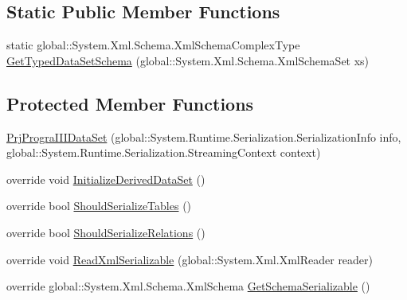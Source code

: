 \subsection*{Static Public Member Functions}
\begin{DoxyCompactItemize}
\item 
static global\+::\+System.\+Xml.\+Schema.\+Xml\+Schema\+Complex\+Type \hyperlink{classprj_progra_i_i_i_1_1_prj_progra_i_i_i_data_set_a52ad2b2277e8116e7216aed0b217b0c0}{Get\+Typed\+Data\+Set\+Schema} (global\+::\+System.\+Xml.\+Schema.\+Xml\+Schema\+Set xs)
\end{DoxyCompactItemize}
\subsection*{Protected Member Functions}
\begin{DoxyCompactItemize}
\item 
\hyperlink{classprj_progra_i_i_i_1_1_prj_progra_i_i_i_data_set_a77b5d9880ccd62a00c3daae6c0f13cc3}{Prj\+Progra\+I\+I\+I\+Data\+Set} (global\+::\+System.\+Runtime.\+Serialization.\+Serialization\+Info info, global\+::\+System.\+Runtime.\+Serialization.\+Streaming\+Context context)
\item 
override void \hyperlink{classprj_progra_i_i_i_1_1_prj_progra_i_i_i_data_set_aa8541b1f58ec4d21af6ae9e40bad3646}{Initialize\+Derived\+Data\+Set} ()
\item 
override bool \hyperlink{classprj_progra_i_i_i_1_1_prj_progra_i_i_i_data_set_a48de6e236e01ba517b1fab0450329d98}{Should\+Serialize\+Tables} ()
\item 
override bool \hyperlink{classprj_progra_i_i_i_1_1_prj_progra_i_i_i_data_set_a8badd38e1dc1ec5999199bdd0f3ac5b0}{Should\+Serialize\+Relations} ()
\item 
override void \hyperlink{classprj_progra_i_i_i_1_1_prj_progra_i_i_i_data_set_a21a8550e3e06446282a9f8aa1511f3ad}{Read\+Xml\+Serializable} (global\+::\+System.\+Xml.\+Xml\+Reader reader)
\item 
override global\+::\+System.\+Xml.\+Schema.\+Xml\+Schema \hyperlink{classprj_progra_i_i_i_1_1_prj_progra_i_i_i_data_set_ac4b8269434db29a816c120afe4f2d695}{Get\+Schema\+Serializable} ()
\end{DoxyCompactItemize}
